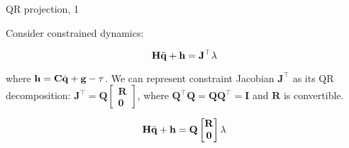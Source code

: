 \documentclass{beamer}
\begin{document}
\begin{frame}{QR projection, 1}
	\begin{flushleft}
		
	Consider constrained dynamics:
		
		\begin{equation}
			\mathbf{H}\ddot{\mathbf{q}} + \mathbf{h} = \mathbf{J}^\top \lambda
		\end{equation}
		
		where $\mathbf{h} =  \mathbf{C}\dot{\mathbf{q}} + \mathbf{g} - \tau$. We can represent constraint Jacobian $\mathbf{J}^\top$ as its QR decomposition: $\mathbf{J}^\top = \mathbf{Q} \begin{bmatrix} \mathbf{R} \\ \mathbf{0}  \end{bmatrix}$, where $\mathbf{Q}^\top \mathbf{Q} = \mathbf{Q} \mathbf{Q}^\top = \mathbf{I}$ and $\mathbf{R}$ is convertible.
		
		\begin{equation}
			\mathbf{H}\ddot{\mathbf{q}} + \mathbf{h} = \mathbf{Q} \begin{bmatrix} \mathbf{R} \\ \mathbf{0}  \end{bmatrix} \lambda
		\end{equation}
		
		
	\end{flushleft}
\end{frame}
\end{document}

